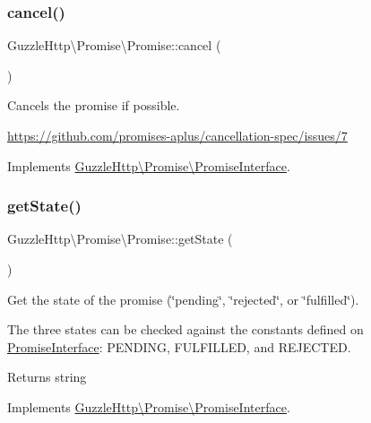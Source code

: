 \subsubsection{\texorpdfstring{cancel()}{cancel()}}
{\footnotesize\ttfamily Guzzle\+Http\textbackslash{}\+Promise\textbackslash{}\+Promise\+::cancel (\begin{DoxyParamCaption}{ }\end{DoxyParamCaption})}

Cancels the promise if possible.

\hyperlink{}{https\+://github.\+com/promises-\/aplus/cancellation-\/spec/issues/7}

Implements \hyperlink{interfaceGuzzleHttp_1_1Promise_1_1PromiseInterface_ab3f2eb63d775492446ab3784618aeef8}{Guzzle\+Http\textbackslash{}\+Promise\textbackslash{}\+Promise\+Interface}.

\mbox{\label{classGuzzleHttp_1_1Promise_1_1Promise_a598a43e196fc3fd6445a9ca5e5b974f3}} 
\subsubsection{\texorpdfstring{get\+State()}{getState()}}
{\footnotesize\ttfamily Guzzle\+Http\textbackslash{}\+Promise\textbackslash{}\+Promise\+::get\+State (\begin{DoxyParamCaption}{ }\end{DoxyParamCaption})}

Get the state of the promise (\char`\"{}pending\char`\"{}, \char`\"{}rejected\char`\"{}, or \char`\"{}fulfilled\char`\"{}).

The three states can be checked against the constants defined on \hyperlink{interfaceGuzzleHttp_1_1Promise_1_1PromiseInterface}{Promise\+Interface}\+: P\+E\+N\+D\+I\+NG, F\+U\+L\+F\+I\+L\+L\+ED, and R\+E\+J\+E\+C\+T\+ED.

\begin{DoxyReturn}{Returns}
string 
\end{DoxyReturn}


Implements \hyperlink{interfaceGuzzleHttp_1_1Promise_1_1PromiseInterface_a4473485faedc0b6489ff28b4fbdc2330}{Guzzle\+Http\textbackslash{}\+Promise\textbackslash{}\+Promise\+Interface}.

